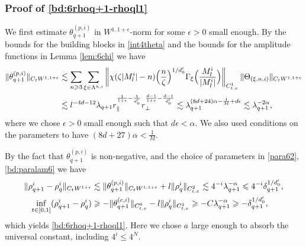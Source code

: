 \documentclass[10pt,a4paper]{amsart}
\numberwithin{equation}{section}
\def\({{\Big(}}
\def\){{\Big)}}
\newcommand{\norm}[1]{\left\|#1\right\|}
\def\geq{\geqslant}
\def\leq{\leqslant}
\def\({{\Big(}}
\def\){{\Big)}}
\def\geq{\geqslant}
\def\leq{\leqslant}
\begin{document}
\subsubsection{Proof of   \eqref{bd:6rhoq+1-rhoql1}}
We first estimate $\theta_{q+1}^{(p,i)}$ in $W^{1,1+\epsilon}$-norm for some $\epsilon>0$ small enough. By the bounds for the building blocks in \eqref{int4theta}   and the bounds for the amplitude functions in Lemma \ref{lem:6chi} we have
\begin{align}
\|\theta_{q+1}^{(p,i)}\|_{C_tW^{1,1+\epsilon}}&\lesssim\sum_{n\geq3}\sum_{\xi\in\Lambda^{n,i}}\norm{\chi(\zeta|M^{i}_l|-n)\(\frac{n}{\zeta}\)^{1/d_0'}\Gamma_{\xi}\(\frac{M^{i}_l}{|M^{i}_l|}\)}_{C_{t,x}^1}\|\Theta_{(\xi,n,i)} \|_{C_tW^{1,1+\epsilon}} \notag\\ 
&\lesssim l^{-4d-12}\lambda_{q+1}r_\parallel^{\frac1{1+\epsilon}-\frac{1}{d_0'}}r_\perp^{\frac{d-1}{1+\epsilon}-\frac{d-1}{d_0'}}%
\lesssim\lambda_{q+1}^{(8d+24)\alpha-\frac1M+d\epsilon}\lesssim \lambda_{q+1}^{-2\alpha},\label{bd:6thteaq+1pw11}
\end{align}
where we  chose $\epsilon>0$ small enough such that $d\epsilon<\alpha$. We also used  conditions on the parameters to have $(8d+27)\alpha<\frac1M$. 

By the fact that $\theta_{q+1}^{(p,i)}$ is non-negative, and the choice of parameters in \eqref{para62}, \eqref{bd:paralam6}  we have
\begin{align}
\|\rho^{i}_{q+1}-\rho^{i}_q\|_{C_tW^{1+\epsilon}}
&\lesssim \|\theta_{q+1}^{(p,i)}\|_{C_tW^{1,1+\epsilon}}+l\|\rho_q^i\|_{C_{t,x}^2}\lesssim4^{-i}\lambda_{q+1}^{-\alpha}\leq 4^{-i}\delta_{q+1}^{1/d_0'},\notag\\
    \inf_{t\in [0,1]}(\rho^{i}_{q+1} - \rho^{i}_q)&\geq-\|\theta_{q+1}^{(c,i)}\|_{C_{t,x}^0} -l\|\rho_q^i\|_{C_{t,x}^1}\geq -C\lambda_{q+1}^{-\alpha} \geq -\delta_{q+1}^{1/d_0'},
\end{align}
which yields \eqref{bd:6rhoq+1-rhoql1}.  Here we chose $a$ large enough to absorb the universal constant, including $4^i\leq 4^N$. 
\end{document}
